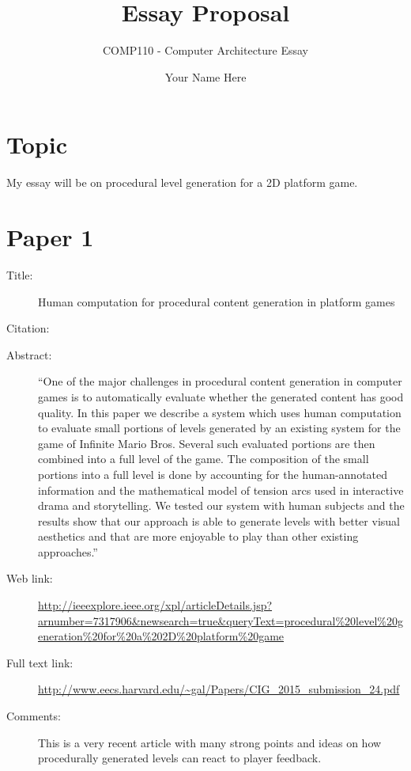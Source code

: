 \documentclass{scrartcl}
\title{Essay Proposal}
\subtitle{COMP110 - Computer Architecture Essay}
\author{Your Name Here}
\begin{document}
\maketitle

\section*{Topic}

My essay will be on
procedural level generation for a 2D platform game.

\section*{Paper 1}
\begin{description}
\item[Title:] Human computation for procedural content generation in platform games
\item[Citation:] \cite{Reis}
\item[Abstract:] ``One of the major challenges in procedural content generation in computer games is to automatically evaluate whether the generated content has good quality. In this paper we describe a system which uses human computation to evaluate small portions of levels generated by an existing system for the game of Infinite Mario Bros. Several such evaluated portions are then combined into a full level of the game. The composition of the small portions into a full level is done by accounting for the human-annotated information and the mathematical model of tension arcs used in interactive drama and storytelling. We tested our system with human subjects and the results show that our approach is able to generate levels with better visual aesthetics and that are more enjoyable to play than other existing approaches.''
\item[Web link:] \url{http://ieeexplore.ieee.org/xpl/articleDetails.jsp?arnumber=7317906&newsearch=true&queryText=procedural\%20level\%20generation\%20for\%20a\%202D\%20platform\%20game}
\item[Full text link:] \url{http://www.eecs.harvard.edu/~gal/Papers/CIG_2015_submission_24.pdf}
\item[Comments:] This is a very recent article with many strong points and ideas on how procedurally generated levels can react to player feedback.
\end{description}
\end{document}
